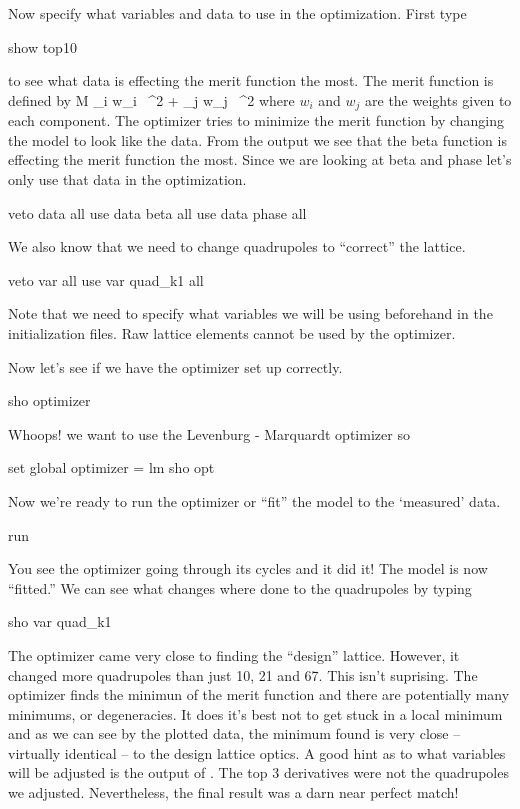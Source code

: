 Now specify what variables and data to use in the optimization. First type
\begin{example}
  show top10
\end{example}
to see what data is effecting the merit function the most. The merit function is
defined by
\Begineq
  {\cal M} \equiv \sum_{i} w_i \,
    ^2 + 
  \sum_{j} w_j \,
    ^2
  \label{m1}
\Endeq
where $w_{i}$ and $w_{j}$ are the weights given to each component.
The optimizer tries to minimize the merit function by changing the model to look
like the data. From the  output we see that the beta function is effecting 
the merit function the most. Since we
are looking at beta and phase let's only use that data in the optimization.
\begin{example}
  veto data all
  use  data beta all
  use  data phase all
\end{example}
We also know that we need to change quadrupoles to ``correct'' the lattice.
\begin{example}
  veto var all
  use var quad\_k1 all
\end{example}
Note that we need to specify what variables we will be using beforehand in the
initialization files. Raw lattice elements cannot be used by the optimizer. 

Now let's see if we have the optimizer set up correctly.
\begin{example}
  sho optimizer
\end{example}
Whoops! we want to use the Levenburg - Marquardt optimizer so
\begin{example}
  set global optimizer = lm
  sho opt
\end{example}

Now we're ready to run the optimizer or ``fit'' the model to the `measured' data.
\begin{example}
  run
\end{example}
You see the optimizer going through its cycles and it did it! The model is now
``fitted.'' We can see what changes where done to the quadrupoles by typing
\begin{example}
  sho var quad\_k1
\end{example}
The optimizer came very close to finding the ``design'' lattice. However, it changed 
more quadrupoles
than just 10, 21 and 67. This isn't suprising. The optimizer finds the minimun
of the merit function and there are potentially many minimums, or degeneracies.
 It does it's best
not to get stuck in a local minimum and as we can see by the plotted data, the
minimum found is very close -- virtually identical -- to the design lattice optics. 
A good hint as to what variables will be adjusted is the output of . 
The top 3
derivatives were not the quadrupoles we adjusted. Nevertheless, the final result
was a darn near perfect match!

